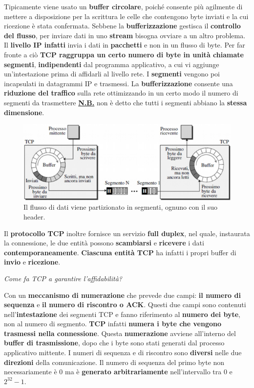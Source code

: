 \documentclass[11pt,a4paper]{article}
\theoremstyle{definition}
\begin{document}
Tipicamente viene usato un \textbf{buffer circolare}, poiché consente più agilmente di mettere a disposizione per la scrittura le celle che contengono byte inviati e la cui ricezione è stata confermata.
\newpage
Sebbene la \textbf{bufferizzazione} gestisca il \textbf{controllo del flusso}, per inviare dati in uno \textbf{stream} bisogna ovviare a un altro problema. Il \textbf{livello IP infatti} invia i dati in \textbf{pacchetti} e non in un flusso di byte. Per far fronte a ciò \textbf{TCP raggruppa un certo numero di byte in unità chiamate segmenti},  \textbf{indipendenti} dal programma applicativo, a cui vi aggiunge un'intestazione prima di affidarli al livello rete.
I \textbf{segmenti} vengono poi incapsulati in datagrammi IP e trasmessi. La \textbf{bufferizzazione} consente una \textbf{riduzione del traffico} sulla rete
ottimizzando in un certo modo il numero di segmenti da trasmettere\newline
\textbf{\underline{N.B.}} non è detto che tutti i segmenti abbiano la \textbf{stessa dimensione}.
\begin{figure}[!h]
	\includegraphics[scale=0.5]{Immagini/TCP_segm.png}
	\centering
	\caption{Il flusso di dati viene partizionato in segmenti, ognuno con il suo header.}
\end{figure}\newline
Il \textbf{protocollo TCP} inoltre fornisce un servizio \textbf{full duplex}, nel quale, instaurata la connessione, le due entità possono \textbf{scambiarsi} e \textbf{ricevere} i dati \textbf{contemporaneamente}. \textbf{Ciascuna entità TCP} ha infatti i propri buffer di \textbf{invio} e \textbf{ricezione}.
\begin{flushleft}
	\textit{Come fa TCP a garantire l'affidabilità?}
\end{flushleft}
Con un \textbf{meccanismo di numerazione} che prevede due campi: \textbf{il numero di sequenza} e \textbf{il numero di riscontro o ACK}. Questi due campi sono contenuti nell'\textbf{intestazione} dei segmenti TCP e fanno riferimento al \textbf{numero dei byte}, non al numero di segmento. \textbf{TCP} infatti \textbf{numera i byte che vengono trasmessi nella connessione}. Questa \textbf{numerazione} avviene all'interno del \textbf{buffer di trasmissione}, dopo che i byte sono stati generati dal processo applicativo mittente. I numeri di sequenza e di riscontro sono \textbf{diversi} nelle due \textbf{direzioni} della comunicazione. Il numero di sequenza del primo byte non necessariamente è 0 ma è \textbf{generato arbitrariamente} nell'intervallo tra 0 e $2^{32} - 1$.\newline
\end{document}
